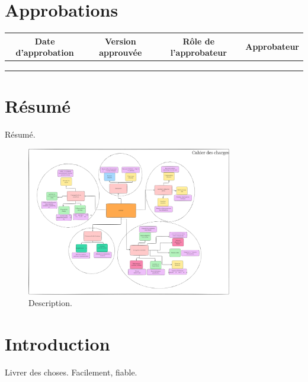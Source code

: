 \documentclass[a4paper,12pt]{report}  %
\begin{document}
	\section*{Approbations}
	\begin{table}[h]
		\begin{tabular}{|c|c|c|c|} 
			\hline
			\textbf{Date d'approbation} & \textbf{Version approuvée} & \textbf{Rôle de l'approbateur} & \textbf{Approbateur} \\
			\hline
			& & & \\
			\hline
			& & & \\
			\hline
			& & & \\
			\hline
		\end{tabular}
	\end{table}
	
		
	\tableofcontents
	
	\pagebreak
	
	\section{Résumé}
	
	Résumé. 
	
	\begin{figure}[h]
		\centering
		\includegraphics[width=0.8\textwidth]{./attachements/Untitled-2025-06-11-1251_B.pdf}
		\caption{Description. }
		\label{fig:your_label}
	\end{figure}
	
	\section{Introduction}
	Livrer des choses. Facilement, fiable.
\end{document}
